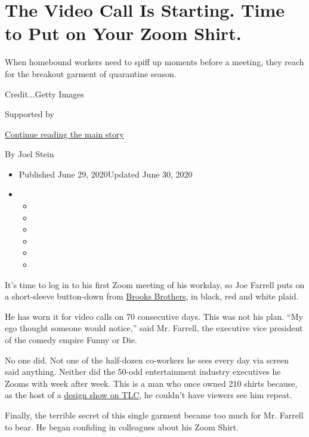 \hypertarget{the-video-call-is-starting-time-to-put-on-your-zoom-shirt}{%
\section{The Video Call Is Starting. Time to Put on Your Zoom
Shirt.}\label{the-video-call-is-starting-time-to-put-on-your-zoom-shirt}}

When homebound workers need to spiff up moments before a meeting, they
reach for the breakout garment of quarantine season.

Credit...Getty Images

Supported by

\protect\hyperlink{after-sponsor}{Continue reading the main story}

By Joel Stein

\begin{itemize}
\item
  Published June 29, 2020Updated June 30, 2020
\item
  \begin{itemize}
  \item
  \item
  \item
  \item
  \item
  \item
  \end{itemize}
\end{itemize}

It's time to log in to his first Zoom meeting of his workday, so Joe
Farrell puts on a short-sleeve button-down from
\href{https://www.nytimes3xbfgragh.onion/2020/07/08/business/brooks-brothers-chapter-11-bankruptcy.html}{Brooks
Brothers}, in black, red and white plaid.

He has worn it for video calls on 70 consecutive days. This was not his
plan. ``My ego thought someone would notice,'' said Mr. Farrell, the
executive vice president of the comedy empire Funny or Die.

No one did. Not one of the half-dozen co-workers he sees every day via
screen said anything. Neither did the 50-odd entertainment industry
executives he Zooms with week after week. This is a man who once owned
210 shirts because, as the host of a
\href{https://www.imdb.com/title/tt0379149/}{design show on TLC}, he
couldn't have viewers see him repeat.

Finally, the terrible secret of this single garment became too much for
Mr. Farrell to bear. He began confiding in colleagues about his Zoom
Shirt.

